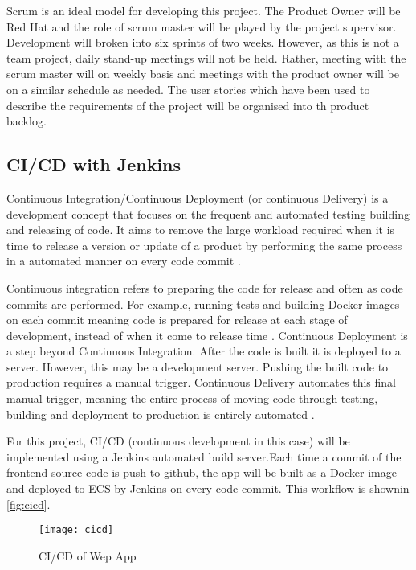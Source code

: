 	Scrum is an ideal model for developing this project. The Product Owner will be Red Hat and the role of scrum master will be played by the project supervisor. Development will broken into six sprints of two weeks. However, as this is not a team project, daily stand-up meetings will not be held. Rather, meeting with the scrum master will on weekly basis and meetings with the product owner will be on a similar schedule as needed. The user stories which have been used to describe the requirements of the project will be organised into th product backlog.
	
	\subsection{CI/CD with Jenkins}
	Continuous Integration/Continuous Deployment (or continuous Delivery) is a development concept that focuses on the frequent and automated testing building and releasing of code. It aims to remove the large workload required when it is time to release a version or update of a product by performing the same process in a automated manner on every code commit \citep{pittet}.
	
	Continuous integration refers to preparing the code for release and often as code commits are performed. For example, running tests and building Docker images on each commit meaning code is prepared for release at each stage of development, instead of when it come to release time \citep{ramos}.
	Continuous Deployment is a step beyond Continuous Integration. After the code is built it is deployed to a server. However, this may be a development server. Pushing the built code to production requires a manual trigger. Continuous Delivery automates this final manual trigger, meaning the entire process of moving code through testing, building and deployment to production is entirely automated \citep{ellingwood}.
	
	For this project, CI/CD (continuous development in this case) will be implemented using a Jenkins automated build server.Each time a commit of the frontend source code is push to github, the app will be built as a Docker image and deployed to ECS by Jenkins on every code commit. This workflow is shownin \autoref{fig:cicd}.
	
	\begin{figure}[H]
		\setlength{\belowcaptionskip}{15pt plus 3pt minus 2pt}
		\caption{CI/CD of Wep App}
		\centering
		\texttt{[image: cicd]}
		\label{fig:cicd}
	\end{figure}
	
